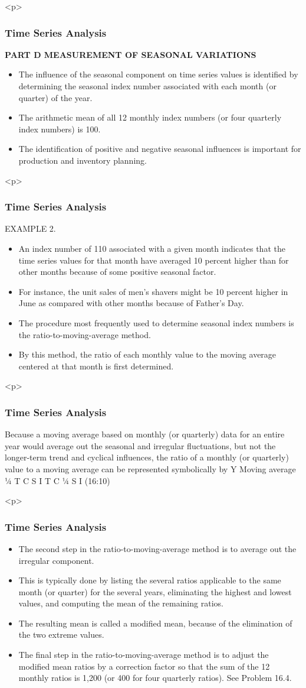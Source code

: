 \documentclass{beamer}
\begin{document}
\begin{itemize}
<p>
\frametitle{Time Series Analysis}
\textbf{PART D  MEASUREMENT OF SEASONAL VARIATIONS}
\begin{itemize}
\item The influence of the seasonal component on time series values is identified by determining the seasonal
index number associated with each month (or quarter) of the year. 
\item The arithmetic mean of all 12 monthly index
numbers (or four quarterly index numbers) is 100. 
\item The identification of positive and negative seasonal
influences is important for production and inventory planning.
\end{itemize}

<p>
\frametitle{Time Series Analysis}
EXAMPLE 2. 
\begin{itemize}
\item An index number of 110 associated with a given month indicates that the time series values for that month
have averaged 10 percent higher than for other months because of some positive seasonal factor. 
\item For instance, the unit sales
of men’s shavers might be 10 percent higher in June as compared with other months because of Father’s Day.
\item The procedure most frequently used to determine seasonal index numbers is the ratio-to-moving-average
method.
\item By this method, the ratio of each monthly value to the moving average centered at that month is first
determined. 
\end{itemize}

<p>
\frametitle{Time Series Analysis}
Because a moving average based on monthly (or quarterly) data for an entire year would average
out the seasonal and irregular fluctuations, but not the longer-term trend and cyclical influences, the ratio of a
monthly (or quarterly) value to a moving average can be represented symbolically by
Y
Moving average
¼
T   C   S   I
T   C
¼ S   I (16:10)


<p>
\frametitle{Time Series Analysis}
\begin{itemize}
\item The second step in the ratio-to-moving-average method is to average out the irregular component.
\item  This is
typically done by listing the several ratios applicable to the same month (or quarter) for the several years,
eliminating the highest and lowest values, and computing the mean of the remaining ratios.
\item  The resulting mean
is called a modified mean, because of the elimination of the two extreme values.
\item The final step in the ratio-to-moving-average method is to adjust the modified mean ratios by a
correction factor so that the sum of the 12 monthly ratios is 1,200 (or 400 for four quarterly ratios). See
Problem 16.4.
\end{itemize}


\end{itemize}
\end{document}
